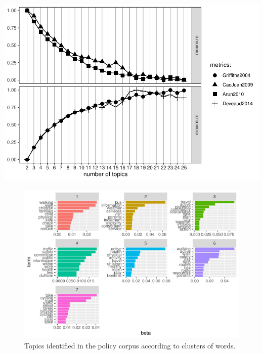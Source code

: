 \documentclass[]{elsarticle} %
\begin{document}
\includegraphics{AST-Framing-Ontario_files/figure-latex/evaluate-lda-5.pdf}

\begin{figure}
\includegraphics[width=1\linewidth]{AST-Framing-Ontario_files/figure-latex/policy-terms-1} \caption{\label{fig:policy-terms}Topics identified in the policy corpus according to clusters of words.}\label{fig:policy-terms}
\end{figure}
\end{document}
